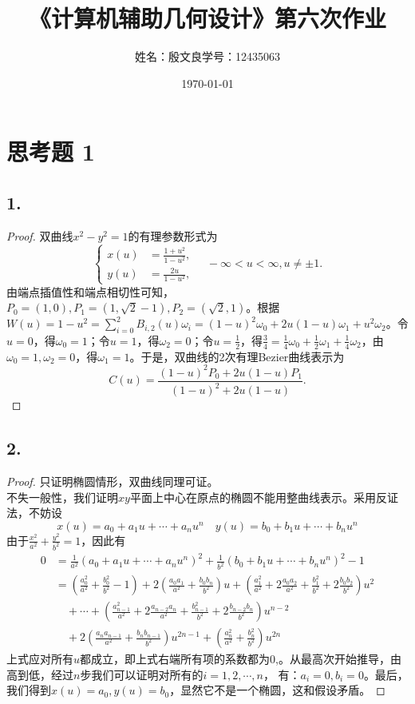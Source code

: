 \documentclass[utf8]{ctexart}
\title{《计算机辅助几何设计》第六次作业}
\author{姓名：殷文良\qquad 学号：12435063}
\date{\today}
\begin{document}
\maketitle
{}

\section*{思考题 1}
\subsection*{1.}
\begin{proof}
    双曲线$x^2-y^2=1$的有理参数形式为
    $$
    \begin{cases}
    x(u) &= \frac{1+u^2}{1-u^2},\\
    y(u) &= \frac{2u}{1-u^2},
    \end{cases}\quad
    -\infty < u < \infty, u\ne \pm 1.
    $$
    由端点插值性和端点相切性可知，$P_0=(1,0),P_1=(1,\sqrt{2}-1),P_2=(\sqrt{2},1)$。根据
    $W(u)=1-u^2=\sum_{i=0}^2B_{i,2}(u)\omega_i = (1-u)^2\omega_0 + 2u(1-u)\omega_1+u^2\omega_2$。令
    $u=0$，得$\omega_0=1$；令$u=1$，得$\omega_2 = 0$；令$u=\frac{1}{2}$，得$\frac{3}{4}=\frac{1}{4}\omega_0 + \frac{1}{2}\omega_1+\frac{1}{4}\omega_2$，由
    $\omega_0=1,\omega_2=0$，得$\omega_1 = 1$。于是，双曲线的2次有理Bezier曲线表示为
    $$
    C(u) = \frac{(1-u)^2P_0 + 2u(1-u)P_1}{(1-u)^2 + 2u(1-u)}.
    $$
\end{proof}
\subsection*{2.}
\begin{proof}
    只证明椭圆情形，双曲线同理可证。\\
    不失一般性，我们证明$xy$平面上中心在原点的椭圆不能用整曲线表示。采用反证法，不妨设
    $$
    x(u) = a_0+a_1u+\cdots + a_nu^n\quad y(u) = b_0+b_1u+\cdots+b_nu^n
    $$
    由于$\frac{x^2}{a^2}+\frac{y^2}{b^2}=1$，因此有
    $$
    \begin{aligned}
    0 &= \frac{1}{a^2}(a_0+a_1u+\cdots+a_nu^n)^2 + \frac{1}{b^2}(b_0+b_1u+\cdots + b_nu^n)^2 - 1\\
    &= (\frac{a_0^2}{a^2}+\frac{b_0^2}{b^2}-1) + 2(\frac{a_0a_1}{a^2}+\frac{b_0b_n}{b^2})u + (\frac{a_1^2}{a^2}+2\frac{a_0a_2}{a^2}+\frac{b_1^2}{b^2}+2\frac{b_0b_2}{b^2})u^2\\
    &\quad + \cdots + (\frac{a_{n-1}^2}{a^2}+2\frac{a_{n-2}a_n}{a^2}+\frac{b_{n-1}^2}{b^2}+2\frac{b_{n-2}b_n}{b^2})u^{n-2}\\
    &\quad + 2(\frac{a_na_{n-1}}{a^2}+\frac{b_nb_{n-1}}{b^2})u^{2n-1} + (\frac{a_n^2}{a^2}+\frac{b_n^2}{b^2})u^{2n}
    \end{aligned}
    $$
    上式应对所有$u$都成立，即上式右端所有项的系数都为0,。从最高次开始推导，由高到低，经过$n$步我们可以证明对所有的$i=1,2,\cdots,n$，
    有：$a_i=0,b_i=0$。最后，我们得到$x(u)=a_0,y(u)=b_0$，显然它不是一个椭圆，这和假设矛盾。
\end{proof}
\end{document}
